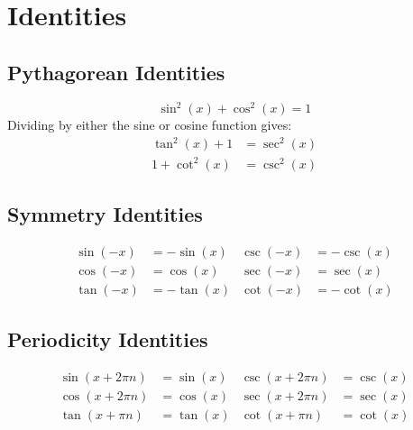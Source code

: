 \documentclass{article}
\begin{document}
\section{Identities}
\subsection{Pythagorean Identities}
\begin{equation*}
	\sin^2{\left( x \right)} + \cos^2{\left( x \right)} = 1
\end{equation*}
Dividing by either the sine or cosine function gives:
\begin{align*}
	\tan^2{\left( x \right)} + 1 &= \sec^2{\left( x \right)} \\
	1 + \cot^2{\left( x \right)} &= \csc^2{\left( x \right)}
\end{align*}
\subsection{Symmetry Identities}
\begin{align*}
		\sin{\left( -x \right)} &= -\sin{\left( x \right)} & \csc{\left( -x \right)} &= -\csc{\left( x \right)} \\
		\cos{\left( -x \right)} &=  \cos{\left( x \right)} & \sec{\left( -x \right)} &=  \sec{\left( x \right)} \\
		\tan{\left( -x \right)} &= -\tan{\left( x \right)} & \cot{\left( -x \right)} &= -\cot{\left( x \right)}
\end{align*}
\subsection{Periodicity Identities}
\begin{align*}
    \sin{\left( x+2\pi n \right)} &= \sin{\left( x \right)} & \csc{\left( x+2\pi n \right)} &= \csc{\left( x \right)} \\
    \cos{\left( x+2\pi n \right)} &= \cos{\left( x \right)} & \sec{\left( x+2\pi n \right)} &= \sec{\left( x \right)} \\
    \tan{\left( x+\pi n \right)}  &= \tan{\left( x \right)} & \cot{\left( x+\pi n \right)}  &= \cot{\left( x \right)}
\end{align*}
\end{document}
